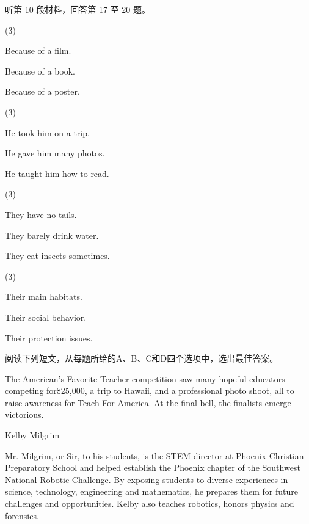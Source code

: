 \documentclass{英语试卷}
\begin{document}
\par 听第 10 段材料，回答第 17 至 20 题。\par
{}
\begin{choices}(3)
  \item Because of a film.
  \item Because of a book.
  \item Because of a poster.
\end{choices}
\begin{choices}(3)
  \item He took him on a trip.
  \item He gave him many photos.
  \item He taught him how to read.
\end{choices}
\begin{choices}(3)
  \item They have no tails.
  \item They barely drink water.
  \item They eat insects sometimes.
\end{choices}
\begin{choices}(3)
  \item Their main habitats.
  \item Their social behavior.
  \item Their protection issues.
\end{choices}
\par 阅读下列短文，从每题所给的A、B、C和D四个选项中，选出最佳答案。\par
{}
\par The American's Favorite Teacher competition saw many hopeful educators competing for\$25,000, a trip to Hawaii, and a professional photo shoot, all to raise awareness for Teach For America. At the final bell, the finalists emerge victorious.\par
\par Kelby Milgrim\par
\par Mr. Milgrim, or Sir, to his students, is the STEM director at Phoenix Christian Preparatory School and helped establish the Phoenix chapter of the Southwest National Robotic Challenge. By exposing students to diverse experiences in science, technology, engineering and mathematics, he prepares them for future challenges and opportunities. Kelby also teaches robotics, honors physics and forensics.\par
\end{document}
